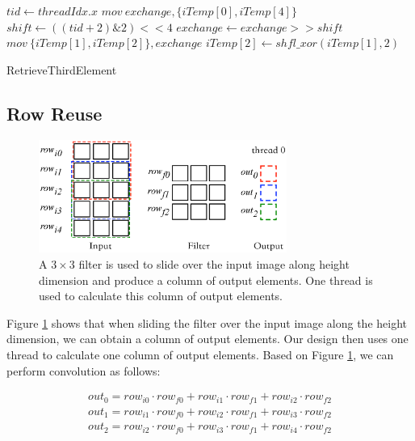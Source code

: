 \begin{algorithm}[t!]
	$tid \gets threadIdx.x$\;
	$mov\ exchange, \{iTemp[0], iTemp[4]\}$\;
	$shift \gets ((tid+2)\&2)<<4$\;
	$exchange \gets exchange >> shift$\;
	$mov\ \{iTemp[1],iTemp[2]\}, exchange$\;
	$iTemp[2] \gets shfl\_xor(iTemp[1],2)$\;	
	
	\caption{RetrieveThirdElement}
	\label{algo:basic}
\end{algorithm}


\subsection{Row Reuse}
\label{sec:rowreuse}
\begin{figure}
	\centering
	\includegraphics[width=0.9\columnwidth,height=3.7cm]{./figure/rowreuse.eps}
\caption{A $3 \times 3$ filter is used to slide over the input image along height dimension and produce a column of output elements. One
thread is used to calculate this column of output elements.}
\label{fig:rowreuse}
\end{figure}

Figure \ref{fig:rowreuse} shows that when sliding the filter over the input image along the height dimension, we can obtain a column of output elements. Our design then uses one thread to calculate one column of output elements. Based on Figure \ref{fig:rowreuse},
we can perform convolution as follows:

\begin{gather*}
  out_0=row_{i0} \cdot row_{f0} + row_{i1} \cdot row_{f1} + row_{i2} \cdot row_{f2} \\
out_{1}=row_{i1} \cdot row_{f0} + row_{i2} \cdot row_{f1} + row_{i3} \cdot row_{f2} \\
out_{2}=row_{i2} \cdot row_{f0} + row_{i3} \cdot row_{f1} + row_{i4} \cdot row_{f2}
\end{gather*}

